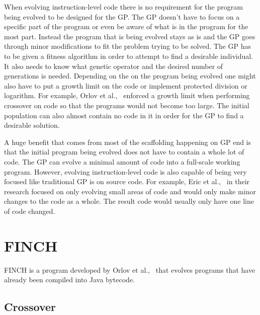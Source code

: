 \documentclass{sig-alternate}
\begin{document}
When evolving instruction-level code there is no requirement for the program being evolved to be designed for the GP. The GP doesn't have to focus on a specific part of the program or even be aware of what is in the program for the most part. Instead the program that is being evolved stays as is and the GP goes through minor modifications to fit the problem trying to be solved. The GP has to be given a fitness algorithm in order to attempt to find a desirable individual. It also needs to know what genetic operator and the desired number of generations is needed. Depending on the on the program being evolved one might also have to put a growth limit on the code or implement protected division or logarithm. For example, Orlov et al.,~\cite{FINCH:2011} enforced a growth limit when performing crossover on code so that the programs would not become too large. The initial population can also almost contain no code in it in order for the GP to find a desirable solution. 

A huge benefit that comes from most of the scaffolding happening on GP end is that the initial program being evolved does not have to contain a whole lot of code. The GP can evolve a minimal amount of code into a full-scale working program. However, evolving instruction-level code is also capable of being very focused like traditional GP is on source code. For example, Eric et al.,~\cite{Assembly:2010} in their research focused on only evolving small areas of code and would only make minor changes to the code as a whole. The result code would usually only have one line of code changed. 




\section{FINCH}
FINCH is a program developed by Orlov et al.,~\cite{FINCH2:2009,FINCH:2011} that evolves programs that have already been compiled into Java bytecode.

\subsection{Crossover}
\end{document}
